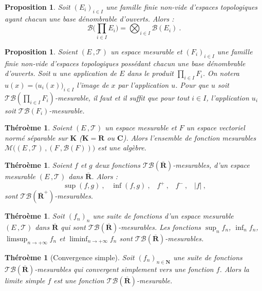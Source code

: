 \documentclass{scrreport}
\theoremstyle{def}
\theoremstyle{thm}
\newtheorem{theorem}[definition]{Théroème}
\theoremstyle{prop}
\newtheorem{proposition}[definition]{Proposition}
\theoremstyle{rem}
\numberwithin{definition}{section}
\numberwithin{lemma}{section}
\numberwithin{proposition}{section}
\numberwithin{theorem}{section}
\numberwithin{corol}{section}
\numberwithin{notation}{section}
\numberwithin{example}{section}
\numberwithin{exercise}{section}
\numberwithin{remark}{section}
\newcommand{\N}{\mathbf{N}}
\newcommand{\R}{\mathbf{R}}
\newcommand{\RR}{\overline{\R}}
\newcommand{\C}{\mathbf{C}}
\newcommand{\K}{\mathbf{K}}
\newcommand{\scrB}{\mathscr{B}}
\newcommand{\scrM}{\mathscr{M}}
\newcommand{\scrT}{\mathscr{T}}
\begin{document}
\begin{proposition}\label{prop1:5:15}
	Soit \({(E_i)}_{i \in I}\) une famille finie non-vide d'espaces topologiques ayant chacun une base dénombrable d'ouverts. Alors :
	\[ \scrB\Biggl(\prod_{i \in I} E_i\Biggr) = \bigotimes_{i \in I} \scrB(E_i) \: \text{.} \]
\end{proposition}

\begin{proposition}\label{prop1:5:16}
	Soient \((E\,, \scrT)\) un espace mesurable et \({(F_i)}_{i \in I}\) une famille finie non-vide d'espaces topologiques possédant chacun une base dénombrable d'ouverts. Soit \(u\) une application de \(E\) dans le produit \(\prod_{i \in I} F_i\). On notera \(u(x) = {\bigl(u_i(x)\bigr)}_{i \in I}\) l'image de \(x\) par l'application \(u\). Pour que \(u\) soit \(\scrT \scrB(\prod_{i \in I}F_i)\)-mesurable, il faut et il suffit que pour tout \(i \in I\), l'application \(u_i\) soit \(\scrT \scrB(F_i)\)-mesurable.
\end{proposition}

\begin{theorem}\label{thm1:5:17}
	Soient \((E\,, \scrT)\) un espace mesurable et \(F\) un espace vectoriel normé séparable sur \(\K\) (\(\K = \R\) ou \(\C\)). Alors l'ensemble de fonction mesurables \(\scrM\bigl((E\,, \scrT) \,, (F\,, \scrB(F))\bigr)\) est une algèbre.
\end{theorem}

\begin{theorem}\label{thm1:5:18}
	Soient \(f\) et \(g\) deux fonctions \(\scrT \scrB(\RR)\)-mesurables, d'un espace mesurable \((E\,, \scrT)\) dans \(\RR\). Alors :
	\[ \sup(f, g) \: \text{,} \quad \inf(f, g) \: \text{,} \quad f^+ \: \text{,} \quad f^- \: \text{,} \quad |f| \: \text{,} \]
	sont \(\scrT \scrB(\RR^+)\)-mesurables.
\end{theorem}

\begin{theorem}\label{thm1:5:19}
	Soit \({(f_n)}_n\) une suite de fonctions d'un espace mesurable \((E\,, \scrT)\) dans \(\RR\) qui sont \(\scrT \scrB(\RR)\)-mesurables. Les fonctions \(\sup_n f_n\), \(\inf_n f_n\), \(\limsup_{n \to +\infty} f_n\) et \(\liminf_{n \to +\infty} f_n\) sont \(\scrT \scrB(\RR)\)-mesurables.
\end{theorem}

\begin{theorem}[Convergence simple]\label{thm1:5:20}
	Soit \({(f_n)}_{n \in \N}\) une suite de fonctions \(\scrT \scrB(\RR)\)-mesurables qui convergent simplement vers une fonction \(f\). Alors la limite simple \(f\) est une fonction \(\scrT \scrB(\RR)\)-mesurable.
\end{theorem}
\end{document}

